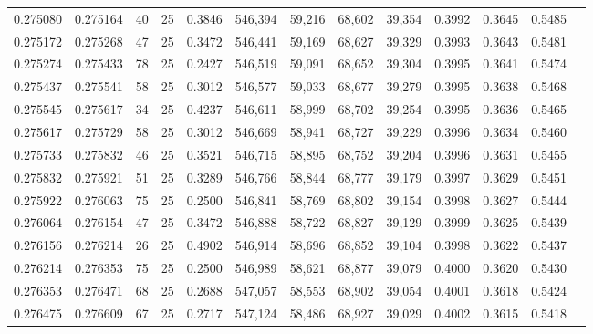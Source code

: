 \begin{tabular}{rrrrrrrrrrrrr}
0.275080 & 0.275164 &    40 &  25 &                                     0.3846 & 546,394 &  59,216 &  68,602 &  39,354 & 0.3992 & 0.3645 & 0.5485 \\
0.275172 & 0.275268 &    47 &  25 &                                     0.3472 & 546,441 &  59,169 &  68,627 &  39,329 & 0.3993 & 0.3643 & 0.5481 \\
0.275274 & 0.275433 &    78 &  25 &                                     0.2427 & 546,519 &  59,091 &  68,652 &  39,304 & 0.3995 & 0.3641 & 0.5474 \\
0.275437 & 0.275541 &    58 &  25 &                                     0.3012 & 546,577 &  59,033 &  68,677 &  39,279 & 0.3995 & 0.3638 & 0.5468 \\
0.275545 & 0.275617 &    34 &  25 &                                     0.4237 & 546,611 &  58,999 &  68,702 &  39,254 & 0.3995 & 0.3636 & 0.5465 \\
0.275617 & 0.275729 &    58 &  25 &                                     0.3012 & 546,669 &  58,941 &  68,727 &  39,229 & 0.3996 & 0.3634 & 0.5460 \\
0.275733 & 0.275832 &    46 &  25 &                                     0.3521 & 546,715 &  58,895 &  68,752 &  39,204 & 0.3996 & 0.3631 & 0.5455 \\
0.275832 & 0.275921 &    51 &  25 &                                     0.3289 & 546,766 &  58,844 &  68,777 &  39,179 & 0.3997 & 0.3629 & 0.5451 \\
0.275922 & 0.276063 &    75 &  25 &                                     0.2500 & 546,841 &  58,769 &  68,802 &  39,154 & 0.3998 & 0.3627 & 0.5444 \\
0.276064 & 0.276154 &    47 &  25 &                                     0.3472 & 546,888 &  58,722 &  68,827 &  39,129 & 0.3999 & 0.3625 & 0.5439 \\
0.276156 & 0.276214 &    26 &  25 &                                     0.4902 & 546,914 &  58,696 &  68,852 &  39,104 & 0.3998 & 0.3622 & 0.5437 \\
0.276214 & 0.276353 &    75 &  25 &                                     0.2500 & 546,989 &  58,621 &  68,877 &  39,079 & 0.4000 & 0.3620 & 0.5430 \\
0.276353 & 0.276471 &    68 &  25 &                                     0.2688 & 547,057 &  58,553 &  68,902 &  39,054 & 0.4001 & 0.3618 & 0.5424 \\
0.276475 & 0.276609 &    67 &  25 &                                     0.2717 & 547,124 &  58,486 &  68,927 &  39,029 & 0.4002 & 0.3615 & 0.5418 \\

\end{tabular}
